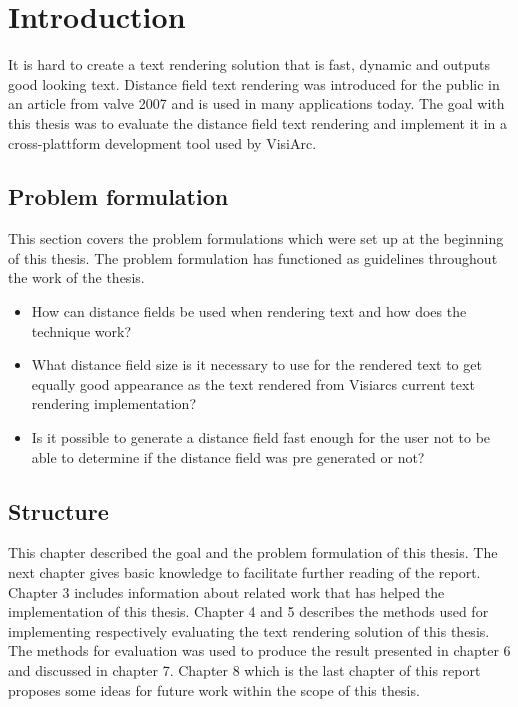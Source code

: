 \chapter{Introduction}\label{cha:intro}
It is hard to create a text rendering solution that is fast, dynamic and outputs good looking text. Distance field text rendering was introduced for the public in an article from valve 2007 and is used in many applications today. The goal with this thesis was to evaluate the distance field text rendering and implement it in a cross-plattform development tool used by VisiArc.
\section{Problem formulation}
This section covers the problem formulations which were set up at the beginning of this thesis. The problem formulation has functioned as guidelines throughout the work of the thesis.
\begin{itemize}
  \item How can distance fields be used when rendering text and how does the technique work?
  \item What distance field size is it necessary to use for the rendered text to get equally good appearance as the text rendered from Visiarcs current text rendering implementation?
  \item Is it possible to generate a distance field fast enough for the user not to be able to determine if the distance field was pre generated or not?
\end{itemize} 
\section{Structure}
This chapter described the goal and the problem formulation of this thesis. The next chapter gives basic knowledge to facilitate further reading of the report. Chapter 3 includes information about related work that has helped the implementation of this thesis. Chapter 4 and 5 describes the methods used for implementing respectively evaluating the text rendering solution of this thesis. The methods for evaluation was used to produce the result presented in chapter 6 and discussed in chapter 7. Chapter 8 which is the last chapter of this report proposes some ideas for future work within the scope of this thesis.